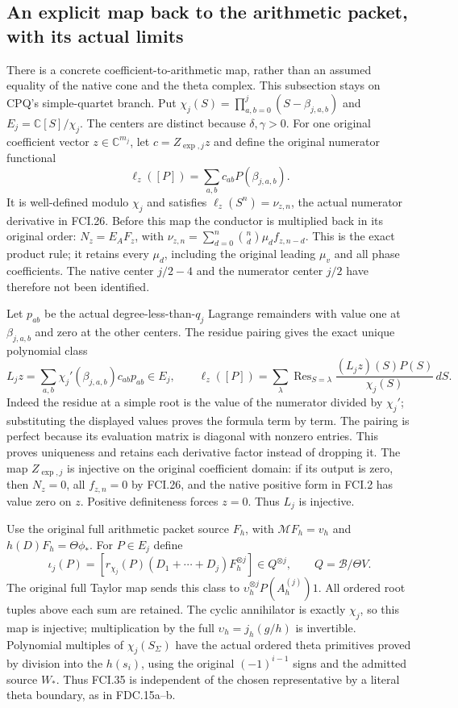 \subsection{An explicit map back to the arithmetic packet, with its actual limits}

There is a concrete coefficient-to-arithmetic map, rather than an
assumed equality of the native cone and the theta complex.  This
subsection stays on CPQ's simple-quartet branch.  Put
$\chi_j(S)=\prod_{a,b=0}^j(S-\beta_{j,a,b})$ and
$E_j=\mathbb C[S]/\chi_j$.  The centers are distinct because
$\delta,\gamma>0$.  For one original coefficient vector $z\in\mathbb C^{m_j}$,
let $c=Z_{\exp,j}z$ and define the original numerator functional
\[
 \ell_z([P])=\sum_{a,b}c_{ab}P(\beta_{j,a,b}).
 \tag{FCI.33}
\]
It is well-defined modulo $\chi_j$ and satisfies
$\ell_z(S^n)=\nu_{z,n}$, the actual numerator derivative in FCI.26.
Before this map the conductor is multiplied back in its original
order: $N_z=E_AF_z$, with
$\nu_{z,n}=\sum_{d=0}^n\binom nd\mu_df_{z,n-d}$.
This is the exact product rule; it retains every $\mu_d$, including
the original leading $\mu_v$ and all phase coefficients.
The native center $j/2-4$ and the numerator center $j/2$ have
therefore not been identified.

Let $p_{ab}$ be the actual degree-less-than-$q_j$ Lagrange remainders
with value one at $\beta_{j,a,b}$ and zero at the other centers.
The residue pairing gives the exact unique polynomial class
\[
 L_jz=\sum_{a,b}\chi_j'(\beta_{j,a,b})c_{ab}p_{ab}\in E_j,
 \qquad
 \ell_z([P])=\sum_\lambda\operatorname{Res}_{S=\lambda}
           \frac{(L_jz)(S)P(S)}{\chi_j(S)}\,dS.
 \tag{FCI.34}
\]
Indeed the residue at a simple root is the value of the numerator
divided by $\chi_j'$; substituting the displayed values proves the
formula term by term.  The pairing is perfect because its evaluation
matrix is diagonal with nonzero entries.  This proves uniqueness and
retains each derivative factor instead of dropping it.
The map $Z_{\exp,j}$ is injective on the original coefficient domain:
if its output is zero, then $N_z=0$, all $f_{z,n}=0$ by FCI.26,
and the native positive form in FCI.2 has value zero on $z$.
Positive definiteness forces $z=0$.  Thus $L_j$ is injective.

Use the original full arithmetic packet source $F_h$, with
$\mathcal MF_h=v_h$ and $h(D)F_h=\Theta\phi_*$.  For $P\in E_j$
define
\[
 \iota_j(P)=[r_{\chi_j}(P)(D_1+\cdots+D_j)F_h^{\otimes j}]
       \in Q^{\otimes j},\qquad Q=\mathscr B/\Theta V.
 \tag{FCI.35}
\]
The original full Taylor map sends this class to
$\upsilon_h^{\otimes j}P(A_h^{(j)})1$.
All ordered root tuples above each sum are retained.  The cyclic
annihilator is exactly $\chi_j$, so this map is injective; multiplication
by the full $\upsilon_h=j_h(g/h)$ is invertible.  Polynomial multiples
of $\chi_j(S_\Sigma)$ have the actual ordered theta primitives proved
by division into the $h(s_i)$, using the original $(-1)^{i-1}$ signs
and the admitted source $W_*$.  Thus FCI.35 is independent of the
chosen representative by a literal theta boundary, as in FDC.15a--b.

